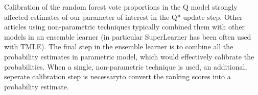 \documentclass[]{article}\usepackage[]{graphicx}\usepackage[]{color}
\begin{document}

Calibration of the random forest vote proportions in the Q model strongly affected estimates of our parameter of interest in the Q* update step. Other articles using non-parametric techniques typically combined them with other models in an ensemble learner (in particular SuperLearner has been often used with TMLE). The final step in the ensemble learner is to combine all the probability estimates in parametric model, which would effectively calibrate the probabilities. When a single, non-parametric technique is used, an additional, seperate calibration step is necessaryto convert the ranking scores into a probability estimate.

\printbibliography
\end{document}
